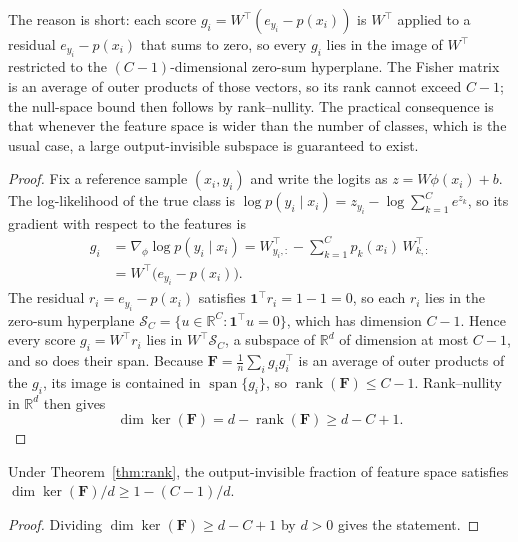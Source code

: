 \documentclass[sigconf,anonymous]{acmart}
\begin{document}
The reason is short: each score $g_i = W^{\top}(e_{y_i}-p(x_i))$ is $W^{\top}$
applied to a residual $e_{y_i}-p(x_i)$ that sums to zero, so every $g_i$ lies
in the image of $W^{\top}$ restricted to the $(C-1)$-dimensional zero-sum
hyperplane. The Fisher matrix is an average of outer products of those
vectors, so its rank cannot exceed $C-1$; the null-space bound then follows by
rank--nullity. The practical consequence is that whenever the feature space is
wider than the number of classes, which is the usual case, a large
output-invisible subspace is guaranteed to exist.

\begin{proof}
Fix a reference sample $(x_i, y_i)$ and write the logits as
$z = W\phi(x_i)+b$. The log-likelihood of the true class is
$\log p(y_i\mid x_i) = z_{y_i} - \log\sum_{k=1}^{C} e^{z_k}$, so its gradient
with respect to the features is
\begin{align}
g_i &= \nabla_{\phi}\log p(y_i\mid x_i)
   = W_{y_i,:}^{\top} - \sum_{k=1}^{C} p_k(x_i)\,W_{k,:}^{\top} \nonumber\\
   &= W^{\top}\bigl(e_{y_i}-p(x_i)\bigr).
\end{align}
The residual $r_i = e_{y_i}-p(x_i)$ satisfies
$\mathbf{1}^{\top} r_i = 1-1 = 0$, so each $r_i$ lies in the zero-sum
hyperplane $\mathcal{S}_C = \{u\in\mathbb{R}^{C} : \mathbf{1}^{\top} u = 0\}$,
which has dimension $C-1$. Hence every score $g_i = W^{\top} r_i$ lies in
$W^{\top}\mathcal{S}_C$, a subspace of $\mathbb{R}^d$ of dimension at most
$C-1$, and so does their span. Because $\mathbf{F} = \frac1n\sum_i g_i
g_i^{\top}$ is an average of outer products of the $g_i$, its image is
contained in $\operatorname{span}\{g_i\}$, so $\operatorname{rank}(\mathbf{F})
\le C-1$. Rank--nullity in $\mathbb{R}^d$ then gives
\begin{equation}
\dim\ker(\mathbf{F}) = d - \operatorname{rank}(\mathbf{F}) \ge d - C + 1.
\end{equation}
\end{proof}

\begin{corollary}
\label{cor:fraction}
Under Theorem~\ref{thm:rank}, the output-invisible fraction of feature space
satisfies $\dim\ker(\mathbf{F})/d \ge 1 - (C-1)/d$.
\end{corollary}

\begin{proof}
Dividing $\dim\ker(\mathbf{F}) \ge d - C + 1$ by $d > 0$ gives the statement.
\end{proof}
\end{document}
